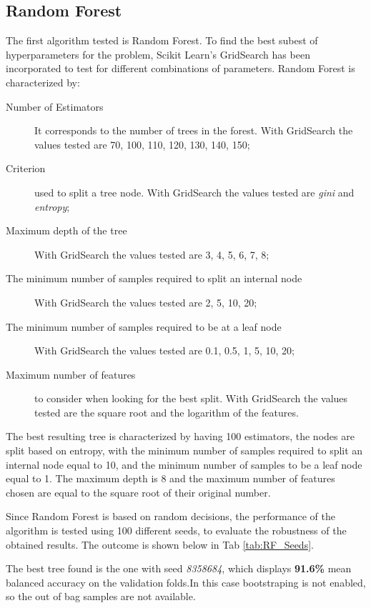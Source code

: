 \subsection{Random Forest}
The first algorithm tested is Random Forest. 
To find the best subest of hyperparameters for the problem, Scikit Learn's GridSearch has been incorporated to test for different combinations of parameters.
Random Forest is characterized by:
\begin{description}
    \item[Number of Estimators] It corresponds to the number of trees in the forest. With GridSearch the values tested are 70, 100, 110, 120, 130, 140, 150;
    \item[Criterion] used to split a tree node. With GridSearch the values tested are \textit{gini} and \textit{entropy};
    \item[Maximum depth of the tree] With GridSearch the values tested are 3, 4, 5, 6, 7, 8;
    \item[The minimum number of samples required to split an internal node]  With GridSearch the values tested are 2, 5, 10, 20;
    \item[The minimum number of samples required to be at a leaf node]  With GridSearch the values tested are 0.1, 0.5, 1, 5, 10, 20;
    \item[Maximum number of features]  to consider when looking for the best split. With GridSearch the values tested are the square root and the logarithm of the features.
\end{description}

The best resulting tree is characterized by having 100 estimators, the nodes are split based on entropy, with the minimum number of samples required to split an internal node equal to 10, and the minimum number of samples to be a leaf node equal to 1. The maximum depth is 8 and the maximum number of features chosen are equal to the square root of their original number.

Since Random Forest is based on random decisions, the performance of the algorithm is tested using 100 different seeds, to evaluate the robustness of the obtained results. The outcome is shown below in Tab \ref{tab:RF_Seeds}.


The best tree found is the one with seed \textit{8358684}, which displays  \textbf{91.6\%} mean balanced accuracy on the validation folds.In this case bootstraping is not enabled, so the out of bag samples are not available.

